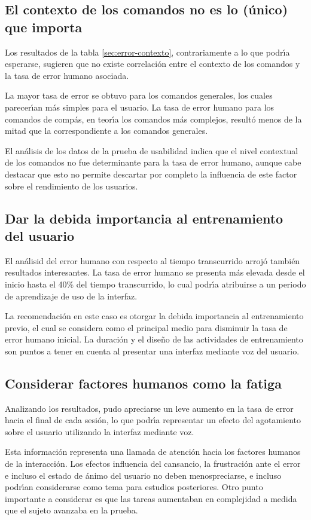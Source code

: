 \subsection{El contexto de los comandos no es lo (\'unico) que importa}
Los resultados de la tabla \ref{sec:error-contexto}, contrariamente a lo que podr{\'\i}a esperarse,
sugieren que no existe correlaci\'on entre el contexto de los comandos y la tasa de error humano asociada.

La mayor tasa de error se obtuvo para los comandos generales, los cuales parecer{\'\i}an m\'as simples 
para el usuario. La tasa de error humano para los comandos de comp\'as, 
en teor{\'\i}a los comandos m\'as complejos,
result\'o menos de la mitad que la correspondiente a los comandos generales.

El an\'alisis de los datos de la prueba de usabilidad indica que el nivel contextual de los comandos no
fue determinante para la tasa de error humano, aunque cabe destacar que esto no permite descartar
por completo la influencia de este factor sobre el rendimiento de los usuarios.


\subsection{Dar la debida importancia al entrenamiento del usuario}
El an\'alisid del error humano con respecto al tiempo transcurrido arroj\'o tambi\'en
resultados interesantes. La tasa de error humano se presenta m\'as elevada desde el inicio hasta
el 40\% del tiempo transcurrido, lo cual podr{{\'\i}}a atribuirse a un periodo de aprendizaje
de uso de la interfaz.

La recomendaci\'on en este caso es otorgar la debida importancia al entrenamiento previo,
el cual se considera como el principal medio para disminuir la tasa de error humano inicial.
La duraci\'on y el dise\~no de las actividades de entrenamiento son puntos a tener en cuenta
al presentar una interfaz mediante voz del usuario.

\subsection{Considerar factores humanos como la fatiga}
Analizando los resultados, pudo apreciarse un leve aumento en la tasa de error hacia el final de
cada sesi\'on, lo que podr{{\'\i}}a representar un efecto del agotamiento sobre el usuario utilizando la
interfaz mediante voz.

Esta informaci\'on representa una llamada de atenci\'on hacia los factores humanos de la interacci\'on.
Los efectos influencia del cansancio, la frustraci\'on ante el error e incluso el estado de \'animo
del usuario no deben menospreciarse, e incluso podr{\'\i}an considerarse como tema para estudios
posteriores. Otro punto importante a considerar es que las tareas aumentaban en complejidad a medida que
el sujeto avanzaba en la prueba.

